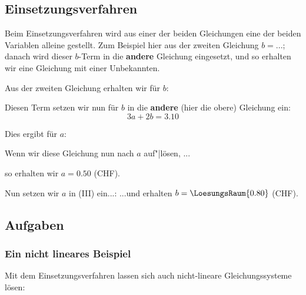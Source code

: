 

\newpage

\subsection{Einsetzungsverfahren}\label{einsetzungsverfahren}
Beim Einsetzungsverfahren wird aus einer der beiden Gleichungen eine der beiden Variablen alleine gestellt. Zum Beispiel hier aus der zweiten Gleichung $b = ...$; danach wird dieser $b$-Term in die \textbf{andere} Gleichung eingesetzt, und so erhalten wir eine Gleichung mit einer Unbekannten.


Aus der zweiten Gleichung erhalten wir für $b$:


Diesen Term setzen wir nun für $b$ in die \textbf{andere} (hier die obere) Gleichung ein:
$$3a+2b = 3.10$$

Dies ergibt für $a$:


Wenn wir diese Gleichung nun nach $a$ auf"|lösen, ...


so erhalten wir $a = 0.50$ (CHF).


Nun setzen wir $a$ in (III) ein...:
...und erhalten $b = \LoesungsRaum{0.80}$ (CHF).


\newpage
\subsection*{Aufgaben}


  
\subsubsection{Ein nicht lineares Beispiel}
Mit dem Einsetzungsverfahren lassen sich auch nicht-lineare
Gleichungssysteme lösen:

